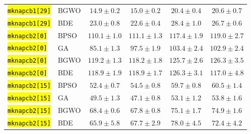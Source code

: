 \documentclass[mathematics,article,accept,moreauthors]{Definitions/mdpi}
\begin{document}
\begin{table}[H]
\begin{tabularx}{\textwidth}{XLCCCC}
    \texttt{\hl{mknapcb1[29]}} & BGWO  &  $\mathbf{14.9 \pm 0.2}$ &           $15.0 \pm 0.2$ &           $20.4 \pm 0.4$ &           $20.6 \pm 0.7$ \\
    \texttt{\hl{mknapcb1[29]}} & BDE   &           $23.0 \pm 0.8$ &  $\mathbf{22.6 \pm 0.4}$ &           $28.4 \pm 1.0$ &           $26.7 \pm 0.6$ \\
    \midrule
    \texttt{\hl{mknapcb2[0]}} & BPSO  & $\mathbf{110.1 \pm 1.0}$ &          $111.1 \pm 1.3$ &          $117.4 \pm 1.9$ &          $119.0 \pm 2.7$ \\
    \texttt{\hl{mknapcb2[0]}} & GA    &  $\mathbf{85.1 \pm 1.3}$ &           $97.5 \pm 1.9$ &          $103.4 \pm 2.4$ &          $102.9 \pm 2.4$ \\
    \texttt{\hl{mknapcb2[0]}} & BGWO  &          $119.2 \pm 1.3$ & $\mathbf{118.2 \pm 1.8}$ &          $125.7 \pm 2.6$ &          $126.3 \pm 3.5$ \\
    \texttt{\hl{mknapcb2[0]}} & BDE   &          $118.9 \pm 1.9$ &          $118.9 \pm 1.7$ &          $126.3 \pm 3.1$ & $\mathbf{117.0 \pm 4.8}$ \\
    \midrule
    \texttt{\hl{mknapcb2[15]}} & BPSO  &  $\mathbf{52.4 \pm 0.7}$ &           $54.5 \pm 0.8$ &           $59.7 \pm 0.8$ &           $60.5 \pm 1.4$ \\
    \texttt{\hl{mknapcb2[15]}} & GA    &           $49.5 \pm 1.3$ &  $\mathbf{47.1 \pm 0.8}$ &           $53.1 \pm 1.2$ &           $53.8 \pm 1.6$ \\
    \texttt{\hl{mknapcb2[15]}} & BGWO  &           $68.4 \pm 0.6$ &  $\mathbf{67.8 \pm 0.8}$ &           $75.1 \pm 1.7$ &           $74.9 \pm 1.6$ \\
    \texttt{\hl{mknapcb2[15]}} & BDE   &  $\mathbf{65.9 \pm 5.8}$ &           $67.7 \pm 2.9$ &           $78.0 \pm 4.5$ &           $72.4 \pm 4.2$ \\


\bottomrule
\end{tabularx} %
\end{table}
\end{document}
